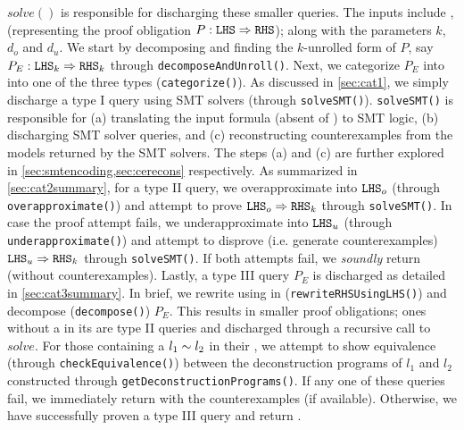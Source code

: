$solve()$ is responsible for discharging these smaller queries.
The inputs include \lhs{}, \rhs{} (representing the proof obligation $P :{\tt LHS}{} \Rightarrow {\tt RHS}{}$);
along with the parameters $k$, $d_o$ and $d_u$.
We start by decomposing and finding the $k$-unrolled form of $P$, say $P_E : {\tt LHS}{}_k \Rightarrow {\tt RHS}{}_k$ through {\tt decomposeAndUnroll()}.
Next, we categorize $P_E$ into into one of the three types ({\tt categorize()}).
As discussed in \cref{sec:cat1}, we simply discharge a type I query using SMT solvers (through {\tt solveSMT()}).
{\tt solveSMT()} is responsible for (a) translating the input formula (absent of \recursiveRelations{})
to SMT logic, (b) discharging SMT solver queries, and
(c) reconstructing counterexamples from the models returned by the SMT solvers.
The steps (a) and (c) are further explored in \cref{sec:smtencoding,sec:cerecons} respectively.
As summarized in \cref{sec:cat2summary}, for a type II query, we overapproximate \lhs{} into ${\tt LHS}{}_o$ (through {\tt overapproximate()})
and attempt to prove ${\tt LHS}{}_o \Rightarrow {\tt RHS}{}_k$ through {\tt solveSMT()}.
In case the proof attempt fails, we underapproximate \lhs{} into ${\tt LHS}{}_u$ (through {\tt underapproximate()})
and attempt to disprove (i.e. generate counterexamples) ${\tt LHS}{}_u \Rightarrow {\tt RHS}_k{}$ through {\tt solveSMT()}.
If both attempts fail, we {\em soundly} return  (without counterexamples).
Lastly, a type III query $P_E$ is discharged as detailed in \cref{sec:cat3summary}.
In brief, we rewrite \rhs{} using \recursiveRelations{} in \lhs{} ({\tt rewriteRHSUsingLHS()}) and decompose ({\tt decompose()}) $P_E$.
This results in smaller proof obligations; ones without a \recursiveRelation{} in its \rhs{}
are type II queries and discharged through a recursive call to $solve$.
For those containing a \recursiveRelation{} $l_1 \sim{} l_2$ in their \rhs{},
we attempt to show equivalence (through {\tt checkEquivalence()}) between the deconstruction programs
of $l_1$ and $l_2$ constructed through {\tt getDeconstructionPrograms()}.
If any one of these queries fail, we immediately return  with the counterexamples (if available).
Otherwise, we have successfully proven a type III query and return .
